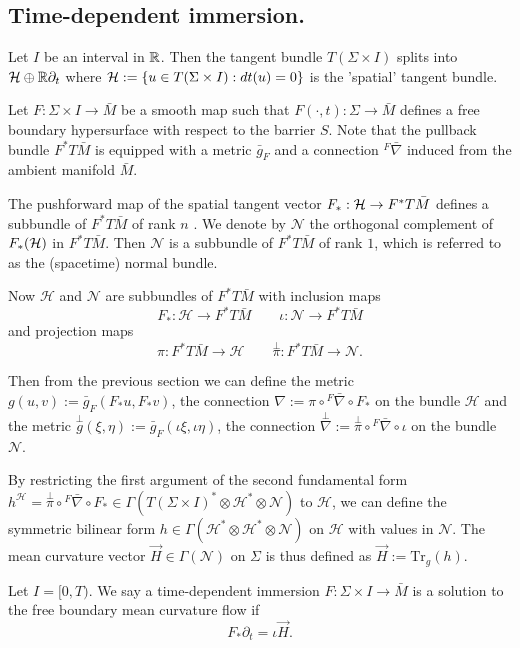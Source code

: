 \subsection{Time-dependent immersion.}
Let $I$ be an interval in $\mathbb{R}$. Then the tangent bundle $T(\Sigma \times I)$ splits into $\mathcal{H} \oplus \mathbb{R} \partial_t$ where $\mathcal{H} := \left\{ u \in T(\Sigma \times I) : dt(u)=0\right\} $  is the 'spatial' tangent bundle.

Let $F: \Sigma \times I \to \bar{M}$ be a smooth map such that $F(\cdot,t) : \Sigma \to \bar{M} $ defines a free boundary hypersurface with respect to the barrier $S$. Note that the pullback bundle $F^*T\bar{M}$ is equipped with a metric $\bar{g}_F$ and a connection ${}^F \bar{\nabla }$ induced from the ambient manifold $\bar{M}$. 

The pushforward map of the spatial tangent vector $F_* : \mathcal{H} \to F^*T\bar{M} $ defines a subbundle of $F^*T\bar{M}$ of rank $n$ . We denote by $\mathcal{N} $ the orthogonal complement of $F_*(\mathcal{H})$ in $F^*T\bar{M}$. Then $\mathcal{N} $ is a subbundle of $F^*T\bar{M} $ of rank $1$, which is referred to as the (spacetime) normal bundle.

Now $\mathcal{H} $ and $\mathcal{N} $ are subbundles of $F^*T\bar{M} $ with inclusion maps
\[F_*: \mathcal{H} \to F^*T\bar{M} \qquad \iota : \mathcal{N} \to F^*T\bar{M} \]
and projection maps
\[\pi : F^*T\bar{M} \to \mathcal{H} \qquad \overset{\perp }{\pi} : F^*T\bar{M} \to \mathcal{N} .\]

Then from the previous section we can define the metric $g(u,v):=\bar{g}_F(F_* u, F_* v)$, the connection $\nabla := \pi \circ {}^F \bar{\nabla } \circ F_*$ on the bundle $\mathcal{H} $ and the metric $\overset{\perp }{g} (\xi , \eta ):=\bar{g}_F(\iota \xi , \iota \eta )$, the connection $\overset{\perp }{\nabla} := \overset{\perp }{\pi} \circ {}^F \bar{\nabla } \circ \iota $ on the bundle $\mathcal{N} $.

By restricting the first argument of the second fundamental form $h^{\mathcal{H} }=\overset{\perp }{\pi} \circ {}^F \bar{\nabla } \circ F_* \in \Gamma (T(\Sigma \times I)^* \otimes \mathcal{H} ^* \otimes \mathcal{N} )$ to $\mathcal{H} $, we can define the symmetric bilinear form $h \in \Gamma (\mathcal{H} ^* \otimes \mathcal{H} ^* \otimes \mathcal{N})$ on $\mathcal{H} $ with values in $\mathcal{N} $. The mean curvature vector $\vec{H} \in \Gamma (\mathcal{N} )$ on $\Sigma $ is thus defined as $\vec{H} := \mathrm{Tr}_g(h)$.

Let $I=[0,T)$. We say a time-dependent immersion $F: \Sigma \times I \to \bar{M}$ is a solution to the free boundary mean curvature flow if \[F_* \partial_t = \iota \vec{H}.\]

